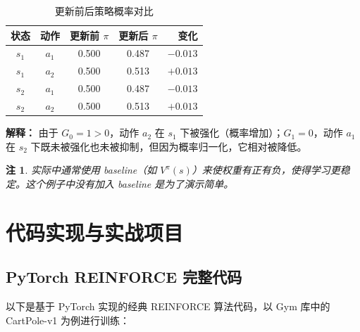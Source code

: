 \documentclass[12pt,a4paper]{article}
\theoremstyle{noteplain}
\newtheorem{notation}{注}[section]
\theoremstyle{noteexercise}
\begin{document}
\begin{table}[H]
  \centering
  \caption{更新前后策略概率对比}
  \label{tab:compare}
  \begin{tabular}{ccccr}
    \toprule
    \textbf{状态} & \textbf{动作} & \textbf{更新前 $\pi$} & \textbf{更新后 $\pi$} & \textbf{变化} \\
    \midrule
    $s_1$ & $a_1$ & 0.500 & 0.487 & $-0.013$ \\
    $s_1$ & $a_2$ & 0.500 & 0.513 & $+0.013$ \\
    $s_2$ & $a_1$ & 0.500 & 0.487 & $-0.013$ \\
    $s_2$ & $a_2$ & 0.500 & 0.513 & $+0.013$ \\
    \bottomrule
  \end{tabular}
\end{table}

\textbf{解释：} 由于 $G_0 = 1 > 0$，动作 $a_2$ 在 $s_1$ 下被强化（概率增加）；$G_1 = 0$，动作 $a_1$ 在 $s_2$ 下既未被强化也未被抑制，但因为概率归一化，它相对被降低。

\begin{notation}
  实际中通常使用 baseline（如 $V^\pi(s)$）来使权重有正有负，使得学习更稳定。这个例子中没有加入 baseline 是为了演示简单。
\end{notation}

\section{代码实现与实战项目}\label{sec:code}

\subsection{PyTorch REINFORCE 完整代码}\label{ssec:pytorch-code}

以下是基于 PyTorch 实现的经典 REINFORCE 算法代码，以 Gym 库中的 CartPole-v1 为例进行训练：
\end{document}
